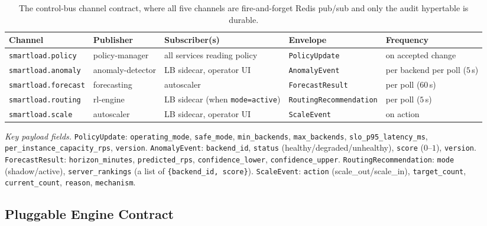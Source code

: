 \begin{table}[H]
\centering
\caption[The control-bus channel contract]{The control-bus channel contract, where all five channels are fire-and-forget Redis pub/sub and only the audit hypertable is durable.}
\label{dsb:tab:channels}
\scriptsize
\begin{tabularx}{\linewidth}{@{}l l Y l Y@{}}
\toprule
\headrow \textbf{Channel} & \textbf{Publisher} & \textbf{Subscriber(s)} & \textbf{Envelope} & \textbf{Frequency} \\
\midrule
\texttt{smartload.policy}
  & policy-manager
  & all services reading policy
  & \texttt{PolicyUpdate}
  & on accepted change \\
\addlinespace
\texttt{smartload.anomaly}
  & anomaly-detector
  & LB sidecar, operator UI
  & \texttt{AnomalyEvent}
  & per backend per poll ($5$\,s) \\
\addlinespace
\texttt{smartload.forecast}
  & forecasting
  & autoscaler
  & \texttt{ForecastResult}
  & per poll ($60$\,s) \\
\addlinespace
\texttt{smartload.routing}
  & rl-engine
  & LB sidecar (when \texttt{mode=active})
  & \texttt{RoutingRecommendation}
  & per poll ($5$\,s) \\
\addlinespace
\texttt{smartload.scale}
  & autoscaler
  & LB sidecar, operator UI
  & \texttt{ScaleEvent}
  & on action \\
\bottomrule
\end{tabularx}

\medskip
\begin{minipage}{\linewidth}
\footnotesize
\textit{Key payload fields.}
\texttt{PolicyUpdate}: \texttt{operating\_mode}, \texttt{safe\_mode},
\texttt{min\_backends}, \texttt{max\_backends}, \texttt{slo\_p95\_latency\_ms},
\texttt{per\_instance\_capacity\_rps}, \texttt{version}.
\texttt{AnomalyEvent}: \texttt{backend\_id}, \texttt{status}
(healthy/degraded/unhealthy), \texttt{score} ($0$--$1$), \texttt{version}.
\texttt{ForecastResult}: \texttt{horizon\_minutes}, \texttt{predicted\_rps},
\texttt{confidence\_lower}, \texttt{confidence\_upper}.
\texttt{RoutingRecommendation}: \texttt{mode} (shadow/active),
\texttt{server\_rankings} (a list of \texttt{\{backend\_id, score\}}).
\texttt{ScaleEvent}: \texttt{action} (scale\_out/scale\_in),
\texttt{target\_count}, \texttt{current\_count}, \texttt{reason},
\texttt{mechanism}.
\end{minipage}
\end{table}

\subsection{Pluggable Engine Contract}
\label{dsb:sec-engine}

